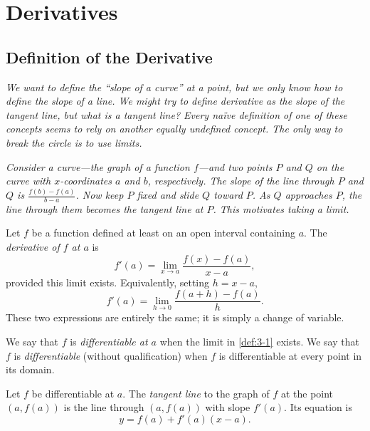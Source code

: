 \chapter{Derivatives}

\section{Definition of the Derivative}
\label{sec:3.1}

\textit{We want to define the ``slope of a curve'' at a point, but we only know how to define the slope of a line.  We might try to define derivative as the slope of the tangent line, but what is a tangent line?  Every na\"ive definition of one of these concepts seems to rely on another equally undefined concept.  The only way to break the circle is to use limits.}

\textit{Consider a curve---the graph of a function $f$---and two points $P$ and $Q$ on the curve with $x$-coordinates $a$ and $b$, respectively.  The slope of the line through $P$ and $Q$ is $\frac{f(b)-f(a)}{b-a}$.  Now keep $P$ fixed and slide $Q$ toward $P$.  As $Q$ approaches $P$, the line through them becomes the tangent line at $P$.  This motivates taking a limit.}

\begin{definition}[Derivative]
\label{def:3-1}
Let $f$ be a function defined at least on an open interval containing $a$.  The \emph{derivative of $f$ at $a$} is
\[
  f'(a) = \lim_{x \to a} \dfrac{f(x) - f(a)}{x - a},
\]
provided this limit exists.  Equivalently, setting $h = x - a$,
\[
  f'(a) = \lim_{h \to 0} \dfrac{f(a+h) - f(a)}{h}.
\]
These two expressions are entirely the same; it is simply a change of variable.
\end{definition}

\begin{definition}[Differentiable]
\label{def:3-2}
We say that $f$ is \emph{differentiable at $a$} when the limit in \cref{def:3-1} exists.  We say that $f$ is \emph{differentiable} (without qualification) when $f$ is differentiable at every point in its domain.
\end{definition}

\begin{definition}
\label{def:3-3}
Let $f$ be differentiable at $a$.  The \emph{tangent line} to the graph of $f$ at the point $(a, f(a))$ is the line through $(a, f(a))$ with slope $f'(a)$.  Its equation is
\[
  y = f(a) + f'(a)(x - a).
\]
\end{definition}

